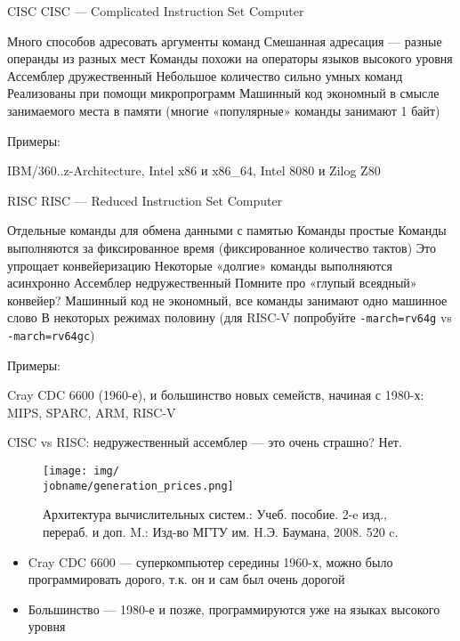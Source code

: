 \documentclass[xetex,aspectratio=43]{beamer}
\begin{document}
\begin{frame}{CISC}
    CISC — Complicated Instruction Set Computer

    \begin{outline}[itemize]
        \1 Много способов адресовать аргументы команд
            \2 Смешанная адресация — разные операнды из разных мест
            \2 Команды похожи на операторы языков высокого уровня
        \1 Ассемблер дружественный
        \1 Небольшое количество сильно умных команд
            \2 Реализованы при помощи микропрограмм
        \1 Машинный код экономный в смысле занимаемого места в памяти (многие «популярные» команды занимают 1 байт)
    \end{outline}

    Примеры:

    IBM/360..z-Architecture, Intel x86 и x86\_64, Intel 8080 и Zilog Z80
\end{frame}

\begin{frame}[fragile]{RISC}
    RISC — Reduced Instruction Set Computer

    \begin{outline}[itemize]
        \1 Отдельные команды для обмена данными с памятью
        \1 Команды простые
            \2 Команды выполняются за фиксированное время (фиксированное количество тактов)
            \2 Это упрощает конвейеризацию
        \1 Некоторые «долгие» команды выполняются асинхронно
        \1 Ассемблер недружественный
            \2 Помните про «глупый всеядный» конвейер?
        \1 Машинный код не экономный, все команды занимают одно машинное слово
            \2 В некоторых режимах половину (для RISC-V попробуйте \texttt{-march=rv64g} vs \texttt{-march=rv64gc})
    \end{outline}

    Примеры:

    Cray CDC 6600 (1960-е), и большинство новых семейств, начиная с 1980-х: MIPS, SPARC, ARM, RISC-V
\end{frame}

\begin{frame}{CISC vs RISC: недружественный ассемблер --- это очень страшно?}
    \pause
    \alert{Нет.}
    \begin{figure}
        \texttt{[image: img/\\jobname/generation\_prices.png]}
        \caption{Архитектура вычислительных систем.: Учеб. пособие. 2-e изд., перераб. и доп. M.: Изд-во МГТУ им. H.Э. Баумана, 2008. 520 c.}
    \end{figure}

    \begin{itemize}
        \item Cray CDC 6600 --- суперкомпьютер середины 1960-х, можно было программировать дорого, т.к. он и сам был очень дорогой
        \item Большинство --- 1980-е и позже, программируются уже на языках высокого уровня
    \end{itemize}
\end{frame}
\end{document}
